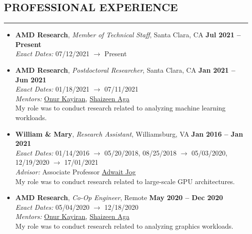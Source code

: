 \documentclass[10pt,a4]{article}
\begin{document}
\subsection*{PROFESSIONAL EXPERIENCE}
\hrule
\vspace{0.2cm}
\begin{itemize}

\item{\bf AMD Research}, {\it Member of Technical Staff}, Santa Clara, CA \hfill {\bf Jul 2021 -- Present}\\
{\it Exact Dates:} 07/12/2021 $\rightarrow$ Present

\item{\bf AMD Research}, {\it Postdoctoral Researcher}, Santa Clara, CA \hfill {\bf Jan 2021 -- Jun 2021}\\
{\it Exact Dates:} 01/18/2021 $\rightarrow$ 07/11/2021\\
{\it Mentors:} \href{https://okayiran.github.io/}{Onur Kayiran}, \href{http://www.shaizeen.com/}{Shaizeen Aga} \\
My role was to conduct research related to analyzing machine learning workloads.

\item{\bf William \& Mary}, {\it Research Assistant}, Williamsburg, VA \hfill {\bf Jan 2016 -- Jan 2021}\\
{\it Exact Dates:} 01/14/2016 $\rightarrow$ 05/20/2018, 08/25/2018 $\rightarrow$ 05/03/2020, 12/19/2020 $\rightarrow$ 17/01/2021\\
{\it Advisor:} Associate  Professor \href{http://www.cs.wm.edu/~adwait/}{Adwait Jog} \\
My role was to conduct research related to large-scale GPU architectures. 

\item{\bf AMD Research}, {\it Co-Op Engineer}, Remote \hfill {\bf May 2020 -- Dec 2020}\\
{\it Exact Dates:} 05/04/2020 $\rightarrow$ 12/18/2020\\
{\it Mentors:} \href{https://okayiran.github.io/}{Onur Kayiran}, \href{http://www.shaizeen.com/}{Shaizeen Aga} \\
My role was to conduct research related to analyzing graphics workloads. 


\end{itemize}
\end{document}

